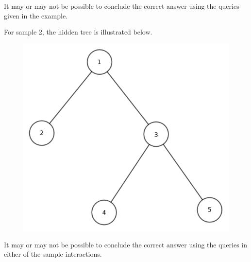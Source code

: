 It may or may not be possible to conclude the correct answer using the queries given in the example.

For sample 2, the hidden tree is illustrated below.

\begin{figure}[h]
  \centering
  \includegraphics[scale=0.3]{example2.png}
\end{figure}

It may or may not be possible to conclude the correct answer using the queries
in either of the sample interactions.
